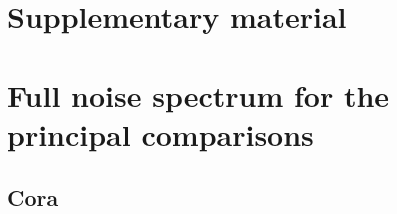 \documentclass[preprint,12pt]{elsarticle}
\begin{document}
\FloatBarrier


\clearpage
\appendix
\section*{Supplementary material}
\renewcommand{\thetable}{\Alph{section}.\arabic{table}}
\renewcommand{\theHtable}{\Alph{section}.\arabic{table}}


\Needspace{395pt}

\FloatBarrier
\setcounter{table}{0}
\section{Full noise spectrum for the principal comparisons}\label{sec:A}

\Needspace{395pt}

\subsection{Cora}\label{sec:A.1}
\end{document}

